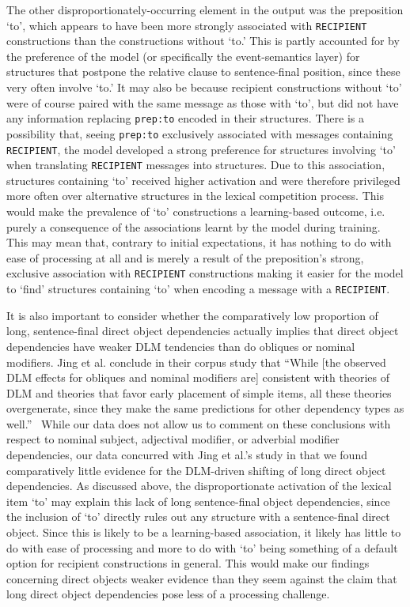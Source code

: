 \documentclass{article}
\begin{document}
The other disproportionately-occurring element in the output was the preposition `to', which appears to have been more strongly associated with \texttt{RECIPIENT} constructions than the constructions without `to.' This is partly accounted for by the preference of the model (or specifically the event-semantics layer) for structures that postpone the relative clause to sentence-final position, since these very often involve `to.' It may also be because recipient constructions without `to' were of course paired with the same message as those with `to', but did not have any information replacing \texttt{prep:to} encoded in their structures. There is a possibility that, seeing \texttt{prep:to} exclusively associated with messages containing \texttt{RECIPIENT}, the model developed a strong preference for structures involving `to' when translating \texttt{RECIPIENT} messages into structures. Due to this association, structures containing `to' received higher activation and were therefore privileged more often over alternative structures in the lexical competition process. This would make the prevalence of `to' constructions a learning-based outcome, i.e. purely a consequence of the associations learnt by the model during training. This may mean that, contrary to initial expectations, it has nothing to do with ease of processing at all and is merely a result of the preposition's strong, exclusive association with \texttt{RECIPIENT} constructions making it easier for the model to `find' structures containing `to' when encoding a message with a \texttt{RECIPIENT}.

It is also important to consider whether the comparatively low proportion of long, sentence-final direct object dependencies actually implies that direct object dependencies have weaker DLM tendencies than do obliques or nominal modifiers. Jing et al. conclude in their corpus study that ``While [the observed DLM effects for obliques and nominal modifiers are] consistent with theories of DLM and theories that favor early placement of simple items, all these theories overgenerate, since they make the same predictions for other dependency types as well.''~\cite{jing2021} While our data does not allow us to comment on these conclusions with respect to nominal subject, adjectival modifier, or adverbial modifier dependencies, our data concurred with Jing et al.'s study in that we found comparatively little evidence for the DLM-driven shifting of long direct object dependencies. As discussed above, the disproportionate activation of the lexical item `to' may explain this lack of long sentence-final object dependencies, since the inclusion of `to' directly rules out any structure with a sentence-final direct object. Since this is likely to be a learning-based association, it likely has little to do with ease of processing and more to do with `to' being something of a default option for recipient constructions in general. This would make our findings concerning direct objects weaker evidence than they seem against the claim that long direct object dependencies pose less of a processing challenge.
\end{document}
